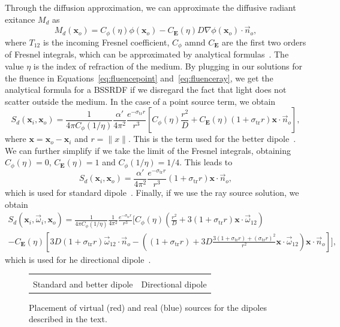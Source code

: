 Through the diffusion approximation, we can approximate the diffusive radiant exitance $M_d$ as
\begin{equation*}
M_d(\mathbf{x}_o) =  C_\phi(\eta) \phi(\mathbf{x}_o) - C_\mathbf{E}(\eta) D \nabla\phi(\mathbf{x}_o) \cdot \vec{n}_o,
\end{equation*}
where $T_{12}$ is the incoming Fresnel coefficient, $C_\phi$ amnd $C_\mathbf{E}$ are the first two orders of Fresnel integrals, which can be approximated by analytical formulas~\cite{dEon2011}. The value $\eta$ is the index of refraction of the medium. By plugging in our solutions for the fluence in Equations~\ref{eq:fluencepoint} and~\ref{eq:fluenceray}, we get the analytical formula for a BSSRDF if we disregard the fact that light does not scatter outside the medium. In the case of a point source term, we obtain
\begin{equation*}
S_d(\mathbf{x}_i, \mathbf{x}_o)  = \frac{1}{4\pi C_\phi(1/\eta)} \frac{\alpha'}{4 \pi^2} \frac{e^{-\sigma_\text{tr} r}}{r^3} \left[ C_\phi(\eta) \frac{r^2}{D} + C_\mathbf{E}(\eta) (1 + \sigma_\text{tr} r) \mathbf{x} \cdot \vec{n}_o \right],
\end{equation*}
where $\mathbf{x} = \mathbf{x}_o - \mathbf{x}_i$ and $r = \|x\|$. This is the term used for the better dipole~\cite{dEon2012}. We can further simplify if we take the limit of the Fresnel integrals, obtaining $C_\phi(\eta) = 0$, $C_\mathbf{E}(\eta) = 1$ and $C_\phi(1/\eta) = 1/4$. This leads to
\begin{equation*}
S_d(\mathbf{x}_i, \mathbf{x}_o)  =  \frac{\alpha'}{4 \pi^2} \frac{e^{-\sigma_\text{tr} r}}{r^3} (1 + \sigma_\text{tr} r) \mathbf{x} \cdot \vec{n}_o,
\end{equation*}
which is used for standard dipole~\cite{Jensen2001}. Finally, if we use the ray source solution, we obtain
\begin{multline*}
S_d(\mathbf{x}_i, \vec{\omega}_i, \mathbf{x}_o)  = \frac{1}{4\pi C_\phi(1/\eta)} \frac{1}{4 \pi^2} \frac{e^{-\sigma_\text{tr} r}}{r^3} \bigg[ C_\phi(\eta) (\frac{r^2}{D} +  3 (1 + \sigma_\text{tr} r) \mathbf{x}\cdot\vec{\omega}_{12} ) \\ - C_\mathbf{E}(\eta) \left[3D (1 + \sigma_\text{tr} r) \vec{\omega}_{12} \cdot \vec{n}_o - \left((1 + \sigma_\text{tr} r) + 3D \frac{3 (1 + \sigma_\text{tr} r)  + (\sigma_\text{tr} r)^2}{r^2}\mathbf{x}\cdot\vec{\omega}_{12}\right) \mathbf{x} \cdot \vec{n}_o\right] \bigg],
\end{multline*}
which is used for he directional dipole~\cite{Frisvad2014}. 
%
\begin{figure}
\centering
\begin{tabular}{@{}c@{\hskip 1em}c@{}}
\def\svgwidth{0.5\textwidth} &  \def\svgwidth{0.5\textwidth} \\
Standard and better dipole &  Directional dipole \\
\end{tabular}
\caption{Placement of virtual (red) and real (blue) sources for the dipoles described in the text.} 
\label{fig:bssrdfsources}
\end{figure}

